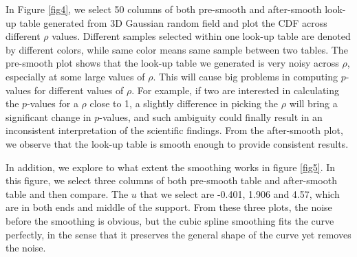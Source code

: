 \documentclass{article}
\begin{document}
In Figure \ref{fig4}, we select 50 columns of both pre-smooth and after-smooth look-up table generated from 3D Gaussian random field and plot the CDF across different $\rho$ values. Different samples selected within one look-up table are denoted by different colors, while same color means same sample between two tables. The pre-smooth plot shows that the look-up table we generated is very noisy across $\rho$, especially at some large values of $\rho$. This will cause big problems in computing $p$-values for different values of $\rho$. For example, if two are interested in calculating the $p$-values for a $\rho$ close to 1, a slightly difference in picking the $\rho$ will bring a significant change in $p$-values, and such ambiguity could finally result in an inconsistent interpretation of the scientific findings. From the after-smooth plot, we observe that the look-up table is smooth enough to provide consistent results. 

In addition, we explore to what extent the smoothing works in figure \ref{fig5}. In this figure, we select three columns of both pre-smooth table and after-smooth table and then compare. The $u$ that we select are -0.401, 1.906 and 4.57, which are in both ends and middle of the support. From these three plots, the noise before the smoothing is obvious, but the cubic spline smoothing fits the curve perfectly, in the sense that it preserves the general shape of the curve yet removes the noise.
\end{document}
